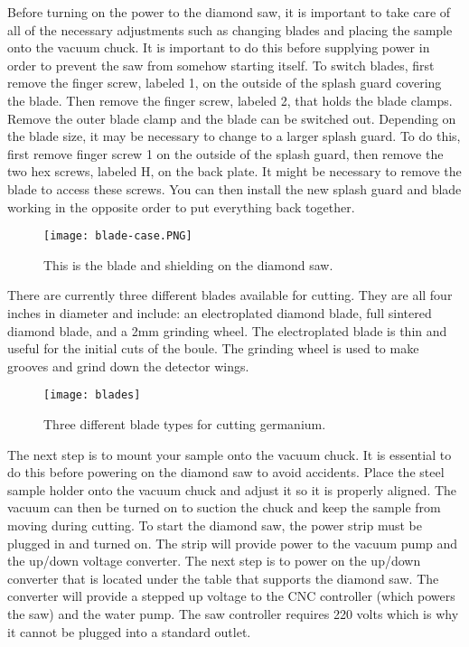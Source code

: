 Before turning on the power to the diamond saw, it is important to take care of all of the necessary adjustments such as changing blades and placing the sample onto the vacuum chuck.
It is important to do this before supplying power in order to prevent the saw from somehow starting itself.
To switch blades, first remove the finger screw, labeled 1, on the outside of the splash guard covering the blade. Then remove the finger screw, labeled 2, that holds the blade clamps.
Remove the outer blade clamp and the blade can be switched out.
Depending on the blade size, it may be necessary to change to a larger splash guard.
To do this, first remove finger screw 1 on the outside of the splash guard, then remove the two hex screws, labeled H, on the back plate.
It might be necessary to remove the blade to access these screws.
You can then install the new splash guard and blade working in the opposite order to put everything back together.
\begin{figure}[htpb]
\centering
\texttt{[image: blade-case.PNG]}
\caption{This is the blade and shielding on the diamond saw.}
\label{fig:blade-case}
\end{figure}

There are currently three different blades available for cutting.
They are all four inches in diameter and include: an electroplated diamond blade, full sintered diamond blade, and a 2mm grinding wheel.
The electroplated blade is thin and useful for the initial cuts of the boule.
The grinding wheel is used to make grooves and grind down the detector wings.
\begin{figure}[htpb]
\centering
\texttt{[image: blades]}
\caption{Three different blade types for cutting germanium.}
\label{fig:blades}
\end{figure}

The next step is to mount your sample onto the vacuum chuck.
It is essential to do this before powering on the diamond saw to avoid accidents.
Place the steel sample holder onto the vacuum chuck and adjust it so it is properly aligned.
The vacuum can then be turned on to suction the chuck and keep the sample from moving during cutting.
To start the diamond saw, the power strip must be plugged in and turned on.
The strip will provide power to the vacuum pump and the up/down voltage converter.
The next step is to power on the up/down converter that is located under the table that supports the diamond saw.
The converter will provide a stepped up voltage to the CNC controller (which powers the saw) and the water pump.
The saw controller requires 220 volts which is why it cannot be plugged into a standard outlet.

